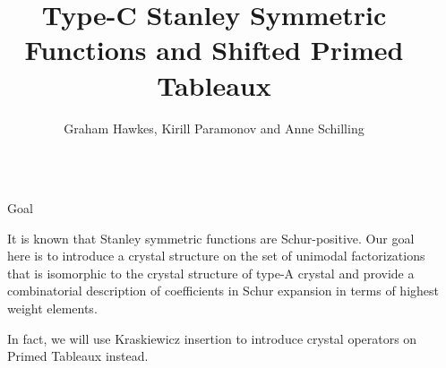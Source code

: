\documentclass[final]{beamer}
\title{Type-C Stanley Symmetric Functions and Shifted Primed Tableaux} %
\author{Graham Hawkes, Kirill Paramonov and Anne Schilling} %
\institute{University of California, Davis} %
\newlength{\sepwid}
\newlength{\onecolwid}
\newlength{\twocolwid}
\begin{document}

\setlength{\belowcaptionskip}{2ex} %
\setlength\belowdisplayshortskip{2ex} %

\begin{frame}[t] %

\begin{columns}[t] %

\begin{column}{\sepwid}\end{column} %

\begin{column}{\twocolwid}\vspace{-.4in} %


\begin{alertblock}{Goal}

It is known that Stanley symmetric functions are Schur-positive. Our goal here is to introduce a crystal structure on the set of unimodal factorizations that is isomorphic to the crystal structure of type-A crystal and provide a combinatorial description of coefficients in Schur expansion in terms of highest weight elements.

In fact, we will use Kraskiewicz insertion to introduce crystal operators on Primed Tableaux instead.
\end{alertblock}



\begin{columns}[t]

\begin{column}{\onecolwid}\vspace{-.8in}



\end{column}
\end{columns}
\end{column}
\end{columns}
\end{frame}
\end{document}
